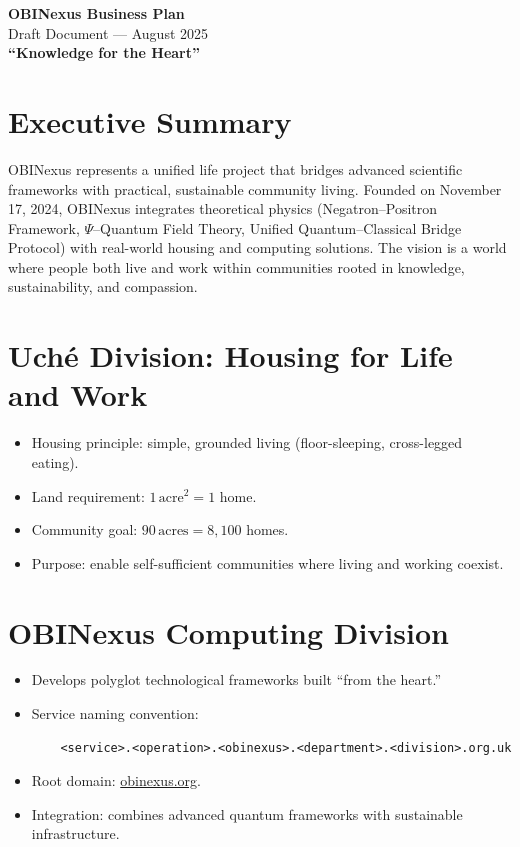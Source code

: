 \documentclass[12pt]{article}
\begin{document}
\begin{center}
    {\LARGE \textbf{OBINexus Business Plan}} \\
    \vspace{0.5em}
    {\large Draft Document --- August 2025} \\
    \vspace{1em}
    {\textbf{``Knowledge for the Heart''}} \\
\end{center}

\section*{Executive Summary}
OBINexus represents a unified life project that bridges advanced scientific frameworks with practical, sustainable community living. Founded on November 17, 2024, OBINexus integrates theoretical physics (Negatron--Positron Framework, $\Psi$--Quantum Field Theory, Unified Quantum--Classical Bridge Protocol) with real-world housing and computing solutions. The vision is a world where people both live and work within communities rooted in knowledge, sustainability, and compassion.

\section*{Uch\'e Division: Housing for Life and Work}
\begin{itemize}[leftmargin=*]
    \item Housing principle: simple, grounded living (floor-sleeping, cross-legged eating).
    \item Land requirement: $1\,\text{acre}^2 = 1$ home.
    \item Community goal: $90\,\text{acres} = 8,100$ homes.
    \item Purpose: enable self-sufficient communities where living and working coexist.
\end{itemize}

\section*{OBINexus Computing Division}
\begin{itemize}[leftmargin=*]
    \item Develops polyglot technological frameworks built ``from the heart.''
    \item Service naming convention:
    \begin{verbatim}
    <service>.<operation>.<obinexus>.<department>.<division>.org.uk
    \end{verbatim}
    \item Root domain: \href{http://obinexus.org}{obinexus.org}.
    \item Integration: combines advanced quantum frameworks with sustainable infrastructure.
\end{itemize}
\end{document}
